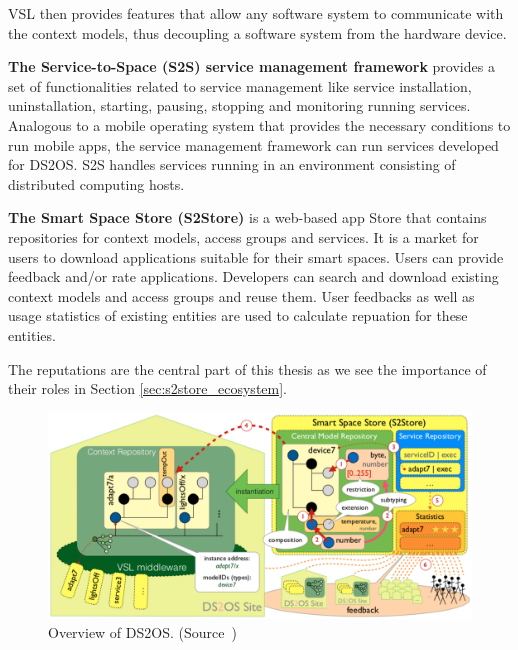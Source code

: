VSL then provides features that allow any software system to communicate with the context models, thus decoupling a software system from the hardware device.

\textbf{The Service-to-Space (S2S) service management framework} provides a set of functionalities related to service management like service installation, uninstallation, starting, pausing, stopping and monitoring running services. Analogous to a mobile operating system that provides the necessary conditions to run mobile apps, the service management framework can run services developed for DS2OS. S2S handles services running in an environment consisting of distributed computing hosts.

\textbf{The Smart Space Store (S2Store)} is a web-based app Store that contains repositories for context models, access groups and services. It is a market for users to download applications suitable for their smart spaces. Users can provide feedback and/or rate applications. Developers can search and download existing context models and access groups and reuse them. User feedbacks as well as usage statistics of existing entities are used to calculate repuation for these entities.

The reputations are the central part of this thesis as we see the importance of their roles in Section \ref{sec:s2store_ecosystem}.

\begin{landscape}

  \begin{figure}
    \centering
    \includegraphics[width=21cm]{figures/ds2os.png} 
    \caption{Overview of DS2OS. (Source~\cite{pahl2014distributed})}
    \label{fig:ds2os}
  \end{figure}

\end{landscape}
